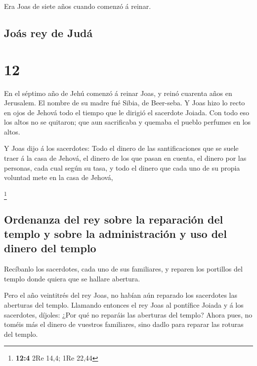  Era Joas de siete años cuando comenzó á reinar.

\hypertarget{jouxe1s-rey-de-juduxe1}{%
\subsection{Joás rey de Judá}\label{jouxe1s-rey-de-juduxe1}}

\hypertarget{section-11}{%
\section{12}\label{section-11}}

 En el séptimo año de Jehú comenzó á reinar Joas, y reinó
cuarenta años en Jerusalem. El nombre de su madre fué Sibia, de
Beer-seba.  Y Joas hizo lo recto en ojos de Jehová todo el
tiempo que le dirigió el sacerdote Joiada.  Con todo eso
los altos no se quitaron; que aun sacrificaba y quemaba el pueblo
perfumes en los altos.

 Y Joas dijo á los sacerdotes: Todo el dinero de las
santificaciones que se suele traer á la casa de Jehová, el dinero de los
que pasan en cuenta, el dinero por las personas, cada cual según su
tasa, y todo el dinero que cada uno de su propia voluntad mete en la
casa de Jehová,

\footnote{\textbf{12:4} 2Re 14,4; 1Re 22,44}

\hypertarget{ordenanza-del-rey-sobre-la-reparaciuxf3n-del-templo-y-sobre-la-administraciuxf3n-y-uso-del-dinero-del-templo}{%
\subsection{Ordenanza del rey sobre la reparación del templo y sobre la
administración y uso del dinero del
templo}\label{ordenanza-del-rey-sobre-la-reparaciuxf3n-del-templo-y-sobre-la-administraciuxf3n-y-uso-del-dinero-del-templo}}

 Recíbanlo los sacerdotes, cada uno de sus familiares, y
reparen los portillos del templo donde quiera que se hallare abertura.

 Pero el año veintitrés del rey Joas, no habían aún
reparado los sacerdotes las aberturas del templo. 
Llamando entonces el rey Joas al pontífice Joiada y á los sacerdotes,
díjoles: ¿Por qué no reparáis las aberturas del templo? Ahora pues, no
toméis más el dinero de vuestros familiares, sino dadlo para reparar las
roturas del templo.

